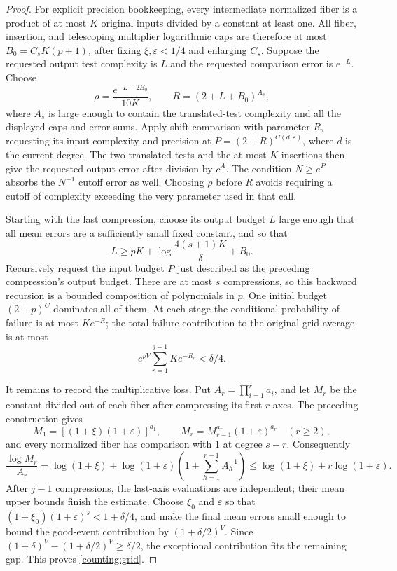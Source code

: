 \begin{proof}
For explicit precision bookkeeping, every intermediate normalized fiber
is a product of at most $K$ original inputs divided by a constant at
least one.  All fiber, insertion, and telescoping multiplier
logarithmic caps are therefore at most
$B_0=C_sK(p+1)$, after fixing $\xi,\varepsilon<1/4$ and enlarging $C_s$.
Suppose the requested output test complexity is $L$ and the requested
comparison error is $e^{-L}$.  Choose
\[
 \rho=\frac{e^{-L-2B_0}}{10K},\qquad
 R=(2+L+B_0)^{A_s},
\]
where $A_s$ is large enough to contain the translated-test complexity
and all the displayed caps and error sums.  Apply shift comparison with
parameter $R$, requesting its input complexity and precision at
$P=(2+R)^{C(d,\varepsilon)}$, where $d$ is the current degree.
The two translated tests and the at most $K$ insertions then give the
requested output error after division by $c^A$.  The condition
$N\geq e^P$ absorbs the $N^{-1}$ cutoff error as well.  Choosing $\rho$
before $R$ avoids requiring a cutoff of complexity exceeding the very
parameter used in that call.

Starting with the last compression, choose its output budget $L$ large
enough that all mean errors are a sufficiently small fixed constant,
and so that
\[
 L\geq pK+\log\frac{4(s+1)K}{\delta}+B_0.
\]
Recursively request the input budget $P$ just described as the preceding
compression's output budget.  There are at most $s$ compressions, so
this backward recursion is a bounded composition of polynomials in
$p$.  One initial budget $(2+p)^C$ dominates all of them.  At each
stage the conditional probability of failure is at most $Ke^{-R}$;
the total failure contribution to the original grid average is at most
\[
 e^{pV}\sum_{r=1}^{j-1}Ke^{-R_r}<\delta/4.
\]

It remains to record the multiplicative loss.  Put
$A_r=\prod_{i=1}^ra_i$, and let $M_r$ be the constant divided out of
each fiber after compressing its first $r$ axes.  The preceding
construction gives
\[
 M_1=[(1+\xi)(1+\varepsilon)]^{a_1},\qquad
 M_r=M_{r-1}^{a_r}(1+\varepsilon)^{a_r}\quad(r\geq2),
\]
and every normalized fiber has comparison with $1$ at degree $s-r$.
Consequently
\[
 \frac{\log M_r}{A_r}
 =\log(1+\xi)+\log(1+\varepsilon)
       \left(1+\sum_{h=1}^{r-1}A_h^{-1}\right)
 \leq\log(1+\xi)+r\log(1+\varepsilon).
\]
After $j-1$ compressions, the last-axis evaluations are independent;
their mean upper bounds finish the estimate.  Choose $\xi_0$ and
$\varepsilon$ so that $(1+\xi_0)(1+\varepsilon)^s<1+\delta/4$,
and make the final mean errors small enough to bound the good-event
contribution by $(1+\delta/2)^V$.  Since
$(1+\delta)^V-(1+\delta/2)^V\geq\delta/2$, the exceptional
contribution fits the remaining gap.  This proves \eqref{counting:grid}.
\end{proof}

